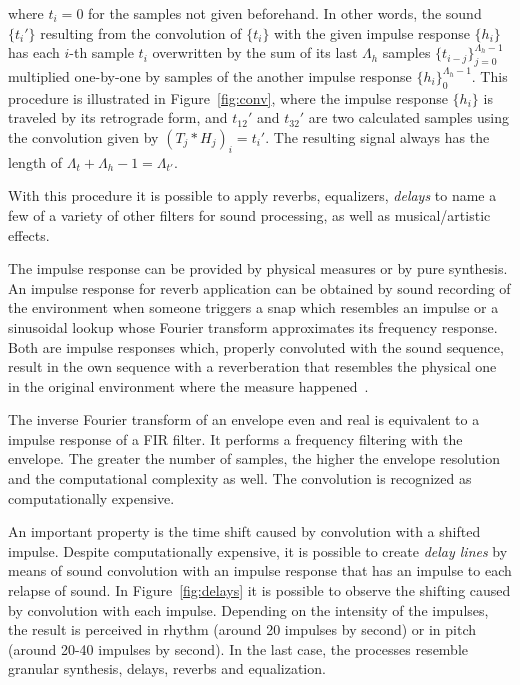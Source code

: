 \documentclass[
 aip,
 jmp,
 amsmath,amssymb,
 reprint,
]{revtex4-1}
\begin{document}
\begin{itemize}
\noindent where $t_i=0$ for the samples not given beforehand.
In other words, the sound $\{t_i'\}$ resulting from the convolution of $\{t_i\}$ with the given impulse response $\{h_i\}$ has each $i$-th sample $t_i$ overwritten by the sum of its last $\Lambda_h$ samples $\{t_{i-j}\}_{j=0}^{\Lambda_h-1}$ multiplied one-by-one by samples of the another impulse response $\{h_i\}_0^{\Lambda_h-1}$. This procedure is illustrated in Figure~\ref{fig:conv}, where the impulse response $\{h_i\}$ is traveled by its retrograde form, and $t_{12}'$ and $t_{32}'$ are two calculated samples using the convolution given by $(T_j*H_j)_i=t_i'$. The resulting signal always has the length of $\Lambda_t+\Lambda_h -1=\Lambda_{t'}$.

With this procedure it is possible to apply reverbs, equalizers, \emph{delays} to name a few of a variety of other filters for sound processing, as well as musical/artistic effects.

The impulse response can be provided by physical measures or by pure synthesis. An impulse response for reverb application can be obtained by sound recording of the environment when someone triggers a snap which resembles an impulse or a sinusoidal lookup whose Fourier transform approximates its frequency response. Both are impulse responses which, properly convoluted with the sound sequence, result in the own sequence with a reverberation that resembles the physical one in the original environment where the measure happened~\cite{Cook}.

The inverse Fourier transform of an envelope even and real is equivalent to a impulse response of a FIR filter. It performs a frequency filtering with the envelope. The greater the number of samples, the higher the envelope resolution and the computational complexity as well. The convolution is recognized as computationally expensive.

An important property is the time shift caused by convolution with a shifted impulse. Despite computationally expensive, it is possible to create \emph{delay lines} by means of sound convolution with an impulse response that has an impulse to each relapse of sound.
In Figure~\ref{fig:delays} it is possible to observe the shifting caused by convolution with each impulse. Depending on the intensity of the impulses, the result is perceived in rhythm (around 20 impulses by second) or in pitch (around 20-40 impulses by second). In the last case, the processes resemble granular synthesis, delays, reverbs and equalization.


\end{itemize}
\end{document}
